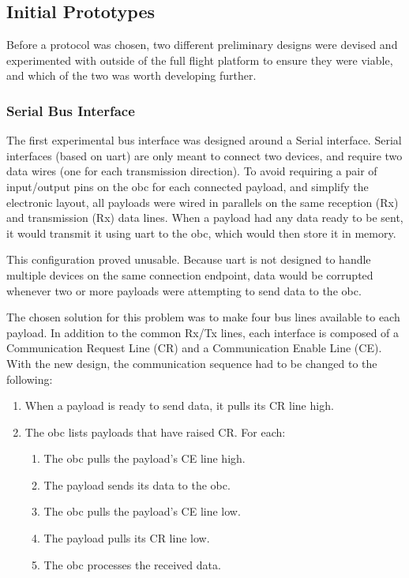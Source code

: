 \subsection{Initial Prototypes}

Before a protocol was chosen, two different preliminary designs were devised
and experimented with outside of the full flight platform to ensure they were
viable, and which of the two was worth developing further.

\subsubsection{Serial Bus Interface}

The first experimental bus interface was designed around a Serial interface.
Serial interfaces (based on \acrshort{uart}) are only meant to connect two
devices, and require two data wires (one for each transmission direction). To
avoid requiring a pair of input/output pins on the \acrlong{obc} for each
connected payload, and simplify the electronic layout, all payloads were wired
in parallels on the same reception (Rx) and transmission (Rx) data lines. When
a payload had any data ready to be sent, it would transmit it using
\acrshort{uart} to the \acrshort{obc}, which would then store it in memory.

This configuration proved unusable. Because \acrshort{uart} is not designed
to handle multiple devices on the same connection endpoint, data would be
corrupted whenever two or more payloads were attempting to send data to the
\acrshort{obc}.

The chosen solution for this problem was to make four bus lines available to
each payload. In addition to the common Rx/Tx lines, each interface is composed
of a Communication Request Line (CR) and a Communication Enable Line (CE). With
the new design, the communication sequence had to be changed to the following:

\begin{enumerate}
\item When a payload is ready to send data, it pulls its CR line high.
\item The \acrshort{obc} lists payloads that have raised CR. For each:
\begin{enumerate}
    \item The \acrshort{obc} pulls the payload's CE line high.
    \item The payload sends its data to the \acrshort{obc}.
    \item The \acrshort{obc} pulls the payload's CE line low.
    \item The payload pulls its CR line low.
    \item The \acrshort{obc} processes the received data.
\end{enumerate}
\end{enumerate}

